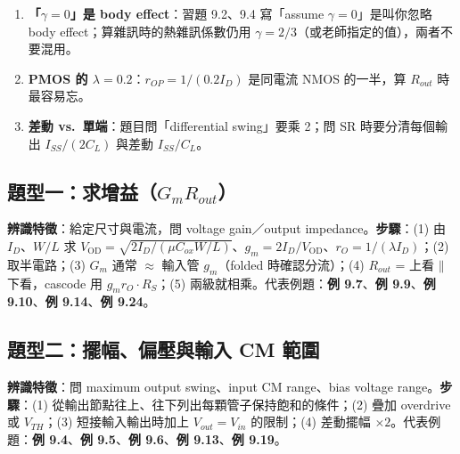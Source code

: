 \documentclass[11pt,a4paper]{article}
\newcommand{\pl}{\mathbin{\|}}
\newcommand{\OD}[1]{V_{\text{OD}#1}}
\newcommand{\exref}[1]{\textcolor{extag}{\textbf{\sffamily 例 #1}}}
\begin{document}
\begin{trapbox}
\begin{enumerate}[leftmargin=2.2em]
  \item \textbf{「$\gamma=0$」是 body effect}：習題 9.2、9.4 寫「assume $\gamma=0$」是叫你忽略 body effect；算雜訊時的熱雜訊係數仍用 $\gamma=2/3$（或老師指定的值），兩者不要混用。
  \item \textbf{PMOS 的 $\lambda=0.2$}：$r_{OP}=1/(0.2I_D)$ 是同電流 NMOS 的一半，算 $R_{out}$ 時最容易忘。
  \item \textbf{差動 vs.\ 單端}：題目問「differential swing」要乘 2；問 SR 時要分清每個輸出 $I_{SS}/(2C_L)$ 與差動 $I_{SS}/C_L$。
\end{enumerate}
\end{trapbox}

\subsection{題型一：求增益（$G_mR_{out}$）}
\textbf{辨識特徵}：給定尺寸與電流，問 voltage gain／output impedance。\textbf{步驟}：(1) 由 $I_D$、$W/L$ 求 $\OD{}=\sqrt{2I_D/(\mu C_{ox}W/L)}$、$g_m=2I_D/\OD{}$、$r_O=1/(\lambda I_D)$；(2) 取半電路；(3) $G_m$ 通常 $\approx$ 輸入管 $g_m$（folded 時確認分流）；(4) $R_{out}$ = 上看 $\pl$ 下看，cascode 用 $g_mr_O\cdot R_S$；(5) 兩級就相乘。代表例題：\exref{9.7}、\exref{9.9}、\exref{9.10}、\exref{9.14}、\exref{9.24}。

\subsection{題型二：擺幅、偏壓與輸入 CM 範圍}
\textbf{辨識特徵}：問 maximum output swing、input CM range、bias voltage range。\textbf{步驟}：(1) 從輸出節點往上、往下列出每顆管子保持飽和的條件；(2) 疊加 overdrive 或 $V_{TH}$；(3) 短接輸入輸出時加上 $V_{out}=V_{in}$ 的限制；(4) 差動擺幅 $\times2$。代表例題：\exref{9.4}、\exref{9.5}、\exref{9.6}、\exref{9.13}、\exref{9.19}。
\end{document}
